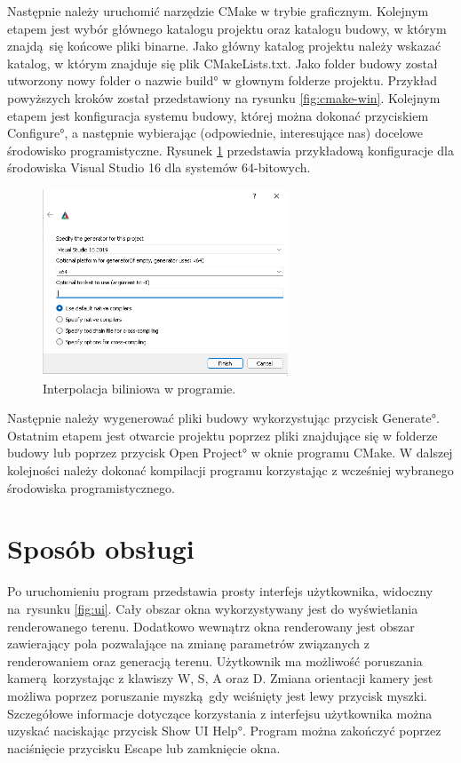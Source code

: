 Następnie należy uruchomić narzędzie CMake w trybie graficznym.
Kolejnym etapem jest wybór głównego katalogu projektu oraz katalogu budowy, w którym znajdą się końcowe pliki binarne.
Jako główny katalog projektu należy wskazać katalog, w którym znajduje się plik CMakeLists.txt.
Jako folder budowy został utworzony nowy folder o nazwie \ang{build} w głownym folderze projektu.
Przykład powyższych kroków został przedstawiony na rysunku \ref{fig:cmake-win}.
Kolejnym etapem jest konfiguracja systemu budowy, której można dokonać przyciskiem \ang{Configure}, a następnie wybierając (odpowiednie, interesujące nas) docelowe środowisko programistyczne. Rysunek \ref{fig:cmake-conf} przedstawia przykładową konfiguracje dla środowiska Visual Studio 16 dla systemów 64-bitowych.

\begin{figure}[H]
\centering
\includegraphics[width=0.65\textwidth]{./graf/cmake-conf.png}
\caption{Interpolacja biliniowa w programie.}
\label{fig:cmake-conf}
\end{figure}

Następnie należy wygenerować pliki budowy wykorzystując przycisk \ang{Generate}.
Ostatnim etapem jest otwarcie projektu poprzez pliki znajdujące się w folderze budowy lub poprzez przycisk \ang{Open Project} w oknie programu CMake. W dalszej kolejności należy dokonać kompilacji programu korzystając z wcześniej wybranego środowiska programistycznego.

\section{Sposób obsługi}
Po uruchomieniu program przedstawia prosty interfejs użytkownika, widoczny na~rysunku \ref{fig:ui}. Cały
obszar okna wykorzystywany jest do wyświetlania renderowanego terenu.
Dodatkowo wewnątrz okna renderowany jest obszar zawierający pola
pozwalające na zmianę parametrów związanych z renderowaniem oraz generacją
terenu. Użytkownik ma możliwość poruszania kamerą korzystając z klawiszy W, S, A oraz D. Zmiana orientacji kamery jest możliwa poprzez poruszanie myszką gdy wciśnięty jest lewy przycisk myszki. Szczegółowe informacje dotyczące korzystania z interfejsu użytkownika można uzyskać naciskając przycisk \ang{Show UI Help}. Program można zakończyć poprzez naciśnięcie przycisku Escape lub zamknięcie okna.

